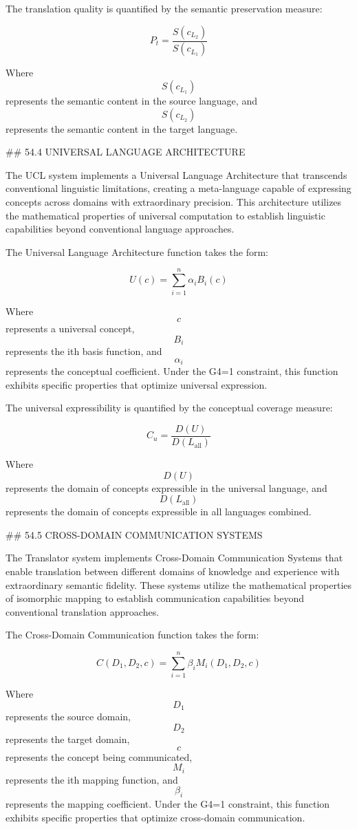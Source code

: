 The translation quality is quantified by the semantic preservation measure:

$$ P_t = \frac{S(c_{L_2})}{S(c_{L_1})} $$

Where $$ S(c_{L_1}) $$ represents the semantic content in the source language, and $$ S(c_{L_2}) $$ represents the semantic content in the target language.

## 54.4 UNIVERSAL LANGUAGE ARCHITECTURE

The UCL system implements a Universal Language Architecture that transcends conventional linguistic limitations, creating a meta-language capable of expressing concepts across domains with extraordinary precision. This architecture utilizes the mathematical properties of universal computation to establish linguistic capabilities beyond conventional language approaches.

The Universal Language Architecture function takes the form:

$$ U(c) = \sum_{i=1}^{n} \alpha_i B_i(c) $$

Where $$ c $$ represents a universal concept, $$ B_i $$ represents the ith basis function, and $$ \alpha_i $$ represents the conceptual coefficient. Under the G4=1 constraint, this function exhibits specific properties that optimize universal expression.

The universal expressibility is quantified by the conceptual coverage measure:

$$ C_u = \frac{D(U)}{D(L_{\text{all}})} $$

Where $$ D(U) $$ represents the domain of concepts expressible in the universal language, and $$ D(L_{\text{all}}) $$ represents the domain of concepts expressible in all languages combined.

## 54.5 CROSS-DOMAIN COMMUNICATION SYSTEMS

The Translator system implements Cross-Domain Communication Systems that enable translation between different domains of knowledge and experience with extraordinary semantic fidelity. These systems utilize the mathematical properties of isomorphic mapping to establish communication capabilities beyond conventional translation approaches.

The Cross-Domain Communication function takes the form:

$$ C(D_1, D_2, c) = \sum_{i=1}^{n} \beta_i M_i(D_1, D_2, c) $$

Where $$ D_1 $$ represents the source domain, $$ D_2 $$ represents the target domain, $$ c $$ represents the concept being communicated, $$ M_i $$ represents the ith mapping function, and $$ \beta_i $$ represents the mapping coefficient. Under the G4=1 constraint, this function exhibits specific properties that optimize cross-domain communication.

